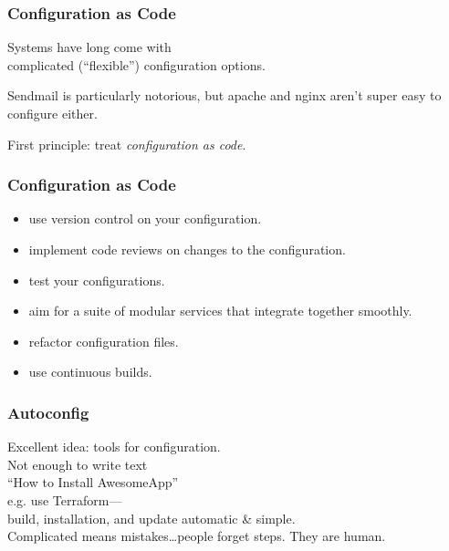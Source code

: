 \begin{frame}
\frametitle{Configuration as Code}

\large

Systems have long come with \\
complicated (``flexible'') configuration options.


Sendmail is particularly notorious, but apache and nginx aren't super
easy to configure either.

First principle: treat \emph{configuration as code}.


\end{frame}



\begin{frame}
\frametitle{Configuration as Code}

\large

\begin{itemize}
\item use version control on your configuration.
\item implement code reviews on changes to the configuration.
\item test your configurations.
\item aim for a suite of modular services that integrate together smoothly.
\item refactor configuration files.
\item use continuous builds.
\end{itemize}


\end{frame}



\begin{frame}
\frametitle{Autoconfig}

\large

Excellent idea: tools for configuration. \\[1em]

Not enough to write text \\
\qquad ``How to Install AwesomeApp'' \\[1em]

e.g. use Terraform---\\
build, installation, and update automatic \& simple.\\[1em]

 Complicated means mistakes\ldots people forget steps. They are human. 
 
 
\end{frame}


